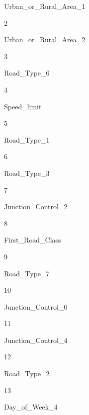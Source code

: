 \documentclass[11pt]{article}
\begin{document}
Urban\_or\_Rural\_Area\_1

2

Urban\_or\_Rural\_Area\_2

3

Road\_Type\_6

4

Speed\_limit

5

Road\_Type\_1

6

Road\_Type\_3

7

Junction\_Control\_2

8

First\_Road\_Class

9

Road\_Type\_7

10

Junction\_Control\_0

11

Junction\_Control\_4

12

Road\_Type\_2

13

Day\_of\_Week\_4


    
    
    
    
\end{document}
